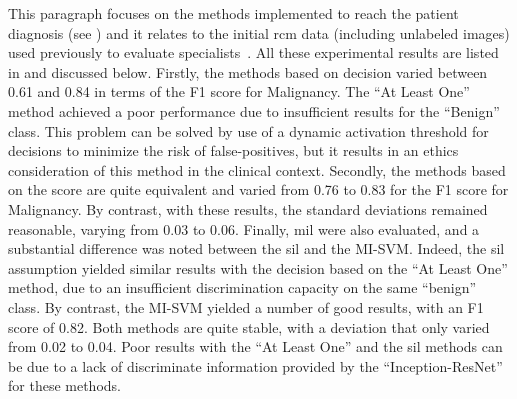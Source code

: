 \documentclass[journal,article,submit,moreauthors,pdftex, applsci]{Definitions/mdpi}
\begin{document}
This paragraph focuses on the methods implemented to reach the patient diagnosis (see ) and it relates to the initial \ac{rcm} data (including unlabeled images) used previously to evaluate specialists~\cite{Cinotti2018}. All these experimental results are listed in  and discussed below. Firstly, the methods based on decision varied between 0.61 and 0.84 in terms of the F1 score for Malignancy. The “At Least One” method achieved a poor performance due to insufficient results for the “Benign” class. This problem can be solved by use of a dynamic activation threshold for decisions to minimize the risk of false-positives, but it results in an ethics consideration of this method in the clinical context. Secondly, the methods based on the score are quite equivalent and varied from 0.76 to 0.83 for the F1 score for Malignancy. By contrast, with these results, the standard deviations remained reasonable, varying from 0.03 to 0.06. Finally, \ac{mil} were also evaluated, and a substantial difference was noted between the \ac{sil} and the MI-SVM. Indeed, the \ac{sil} assumption yielded similar results with the decision based on the “At Least One” method, due to an insufficient discrimination capacity on the same “benign” class. By contrast, the MI-SVM yielded a number of good results, with an F1 score of 0.82. Both methods are quite stable, with a deviation that only varied from 0.02 to 0.04. Poor results with the “At Least One” and the \ac{sil} methods can be due to a lack of discriminate information provided by the “Inception-ResNet” for these methods.\par
\end{document}
